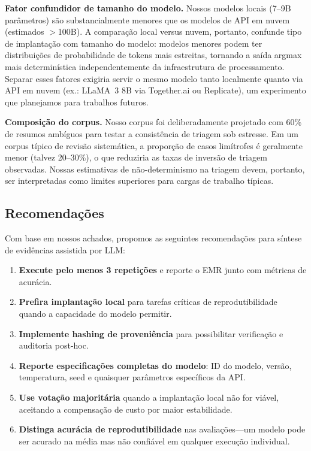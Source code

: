 \documentclass[12pt, a4paper]{article}
\begin{document}
\textbf{Fator confundidor de tamanho do modelo.}
Nossos modelos locais (7--9B parâmetros) são substancialmente menores que os modelos de API em nuvem (estimados $>$100B).
A comparação local versus nuvem, portanto, confunde tipo de implantação com tamanho do modelo: modelos menores podem ter distribuições de probabilidade de tokens mais estreitas, tornando a saída argmax mais determinística independentemente da infraestrutura de processamento.
Separar esses fatores exigiria servir o mesmo modelo tanto localmente quanto via API em nuvem (ex.: LLaMA~3 8B via Together.ai ou Replicate), um experimento que planejamos para trabalhos futuros.

\textbf{Composição do corpus.}
Nosso corpus foi deliberadamente projetado com 60\% de resumos ambíguos para testar a consistência de triagem sob estresse.
Em um corpus típico de revisão sistemática, a proporção de casos limítrofes é geralmente menor (talvez 20--30\%), o que reduziria as taxas de inversão de triagem observadas.
Nossas estimativas de não-determinismo na triagem devem, portanto, ser interpretadas como limites superiores para cargas de trabalho típicas.

\subsection{Recomendações}

Com base em nossos achados, propomos as seguintes recomendações para síntese de evidências assistida por LLM:

\begin{enumerate}
  \item \textbf{Execute pelo menos 3 repetições} e reporte o EMR junto com métricas de acurácia.
  \item \textbf{Prefira implantação local} para tarefas críticas de reprodutibilidade quando a capacidade do modelo permitir.
  \item \textbf{Implemente hashing de proveniência} para possibilitar verificação e auditoria post-hoc.
  \item \textbf{Reporte especificações completas do modelo}: ID do modelo, versão, temperatura, seed e quaisquer parâmetros específicos da API.
  \item \textbf{Use votação majoritária} quando a implantação local não for viável, aceitando a compensação de custo por maior estabilidade.
  \item \textbf{Distinga acurácia de reprodutibilidade} nas avaliações---um modelo pode ser acurado na média mas não confiável em qualquer execução individual.
\end{enumerate}
\end{document}
